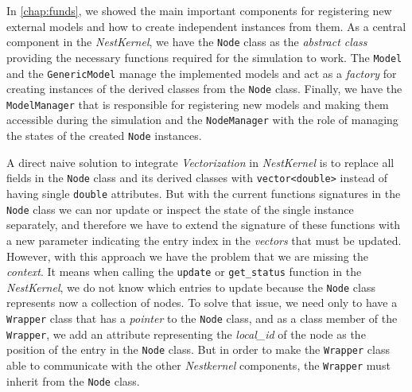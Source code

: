 In \autoref{chap:funds}, we showed the main important components for registering new external models and how to create independent instances from them. As a central component in the \emph{NestKernel}, we have the \texttt{Node} class as the \emph{abstract class} providing the necessary functions required for the simulation to work. The \texttt{Model} and the \texttt{GenericModel} manage the implemented models and act as a \emph{factory} for creating instances of the derived classes from the \texttt{Node} class. Finally, we have the \texttt{ModelManager} that is responsible for registering new models and making them accessible during the simulation and the \texttt{NodeManager} with the role of managing the states of the created \texttt{Node} instances. 


A direct naive solution to integrate \emph{Vectorization} in \emph{NestKernel} is to replace all fields in the \texttt{Node} class and its derived classes with \texttt{vector<double>} instead of having single \texttt{double} attributes. But with the current functions signatures in the \texttt{Node} class we can nor update or inspect the state of the single instance separately, and therefore we have to extend the signature of these functions with a new parameter indicating the entry index in the \emph{vectors} that must be updated. However, with this approach we have the problem that we are missing the \emph{context}. It means  when calling the \texttt{update} or \texttt{get\_status} function in the \emph{NestKernel}, we do not know which entries to update because the \texttt{Node} class represents now a collection of nodes. To solve that issue, we need only to have a \texttt{Wrapper} class that has a \emph{pointer} to the \texttt{Node} class, and as a class member of the \texttt{Wrapper}, we add an attribute representing the \emph{local\_id} of the node as the position of the entry in the \texttt{Node} class. But in order to make the \texttt{Wrapper} class able to communicate with the other \emph{Nestkernel} components, the \texttt{Wrapper} must inherit from the \texttt{Node} class.


